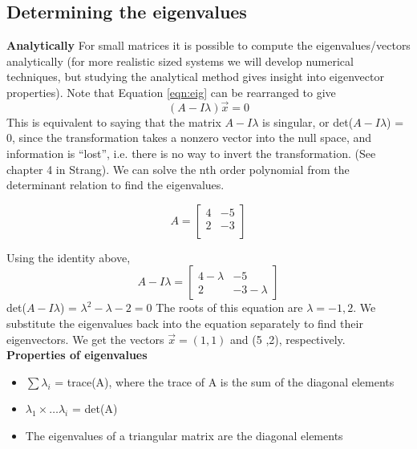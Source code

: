 \documentclass[11pt]{article}
\begin{document}
\subsection{Determining the eigenvalues}

{\bf Analytically}
For small matrices it is possible to compute the eigenvalues/vectors analytically  (for more realistic sized systems we will develop numerical techniques, but studying
the analytical method gives insight into eigenvector properties). Note that Equation \ref{eqn:eig} can be rearranged to give 
$$ (A- I\lambda)\vec{x} = 0 $$
This is equivalent to saying that the matrix $A-I\lambda$ is singular, or det($A-I\lambda$) = 0, since the transformation takes a nonzero vector into the null space, and information is ``lost'', i.e. there is no way to invert the transformation. (See chapter 4 in Strang). We can solve the nth order polynomial from the determinant relation to find the eigenvalues.

$$ A = \begin{bmatrix}
4 & -5 \\
2 & -3 \\
\end{bmatrix}
$$

Using the identity above,
$$ A- I\lambda = \begin{bmatrix}
4- \lambda & -5 \\
2 & -3-\lambda 
\end{bmatrix}
$$
det($A-I\lambda$) = $\lambda^2 - \lambda -2 = 0$ The roots of this equation are $\lambda = -1,2$. We substitute the eigenvalues back into the equation separately to find their eigenvectors. We get the vectors $\vec{x} = (1,1)$ and (5 ,2), respectively. 
\\
{\bf Properties of eigenvalues}
\begin{itemize}
\item $\sum \lambda_i$ = trace(A), where the trace of A is the sum of the diagonal elements
\item $\lambda_1 \times \ldots \lambda_i$ = det(A)
\item The eigenvalues of a triangular matrix are the diagonal elements
\end{itemize}
\end{document}
